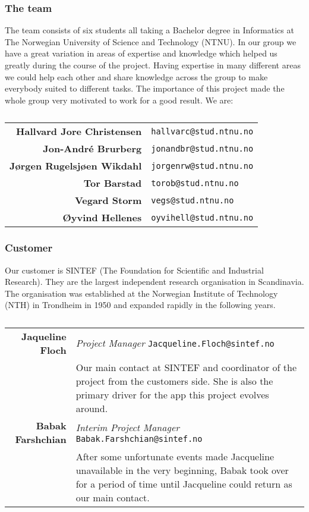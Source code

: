 \subsubsection{The team}
The team consists of six students all taking a Bachelor degree in Informatics at The Norwegian University of Science and Technology (NTNU). In our group we have a great variation in areas of expertise and knowledge which helped us greatly during the course of the project. Having expertise in many different areas we could help each other and share knowledge across the group to make everybody suited to different tasks. The importance of this project made the whole group very motivated to work for a good result.
We are:\\

\begin{table}[!ht]
\begin{tabular}{r|p{11cm}}
\textbf{Hallvard Jore Christensen} & \texttt{hallvarc@stud.ntnu.no}\\[6pt]
\textbf{Jon-André Brurberg} & \texttt{jonandbr@stud.ntnu.no}\\[6pt]
\textbf{Jørgen Rugelsjøen Wikdahl} & \texttt{jorgenrw@stud.ntnu.no}\\[6pt]
\textbf{Tor Barstad} & \texttt{torob@stud.ntnu.no}\\[6pt]
\textbf{Vegard Storm} & \texttt{vegs@stud.ntnu.no}\\[6pt]
\textbf{Øyvind Hellenes} & \texttt{oyvihell@stud.ntnu.no}\\
\end{tabular}
\captionsetup{textformat=empty,labelformat=blank}
\caption[The Team]{}
\end{table}

\subsubsection{Customer}
Our customer is SINTEF (The Foundation for Scientific and Industrial Research). They are the largest independent research organisation in Scandinavia. The organisation was established at the Norwegian Institute of Technology (NTH) in Trondheim in 1950 and expanded rapidly in the following years.

\begin{table}[!ht]
\begin{tabular}{r|p{11cm}}
\textbf{Jaqueline Floch} & \emph{Project Manager}   \texttt{Jacqueline.Floch@sintef.no}\\[4pt]
& Our main contact at SINTEF and coordinator of the project from the customers side. She is also the primary driver for the app this project evolves around. \\[8pt]
\textbf{Babak Farshchian} & \emph{Interim Project Manager}   \texttt{Babak.Farshchian@sintef.no}\\[4pt]
& After some unfortunate events made Jacqueline unavailable in the very beginning, Babak took over for a period of time until Jacqueline could return as our main contact. \\
\end{tabular}
\captionsetup{textformat=empty,labelformat=blank}
\caption[Customer]{}
\end{table}

